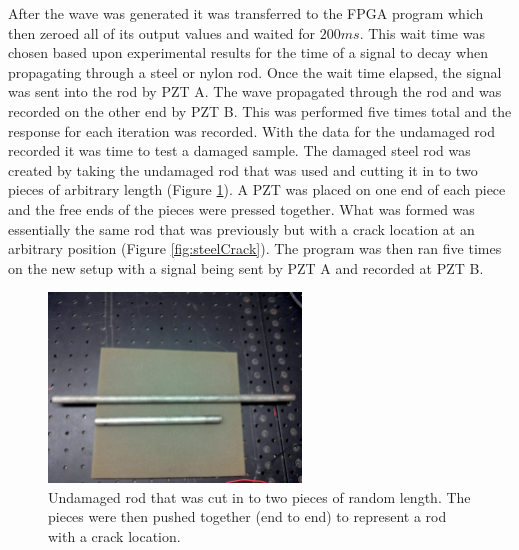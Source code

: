 After the wave was generated it was transferred to the FPGA program which then zeroed all of its output values and waited for $200ms$. This wait time was chosen based upon experimental results for the time of a signal to decay when propagating through a steel or nylon rod. Once the wait time elapsed, the signal was sent into the rod by PZT A. The wave propagated through the rod and was recorded on the other end by PZT B. This was performed five times total and the response for each iteration was recorded. With the data for the undamaged rod recorded it was time to test a damaged sample. The damaged steel rod was created  by taking the undamaged rod that was used and cutting it in to two pieces of arbitrary length (Figure \ref{fig:steelPieces}). A PZT was placed on one end of each piece and the free ends of the pieces were pressed together. What was formed was essentially the same rod that was previously but with a crack location at an arbitrary position (Figure \ref{fig:steelCrack}). The program was then ran five times on the new setup with a signal being sent by PZT A and recorded at PZT B.

\begin{figure}[ht!]
\centering
\includegraphics[width=0.6\textwidth]{eps_pics/steelPieces}
\caption{Undamaged rod that was cut in to two pieces of random length. The pieces were then pushed together (end to end) to represent a rod with a crack location.
 	 \label{fig:steelPieces}} 
\end{figure}

